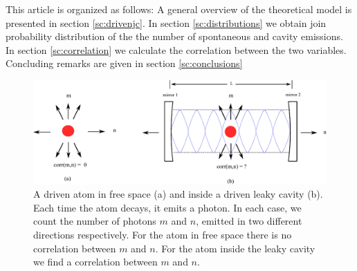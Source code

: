 \documentclass[%
 reprint,
 amsmath,amssymb,
 aps, 
]{revtex4-1}
\begin{document}
This article is organized as follows: A general overview of the
theoretical model is presented in section \ref{sc:drivenjc}. In
section \ref{sc:distributions} we obtain join probability distribution
of the the number of spontaneous and cavity emissions. In section
\ref{sc:correlation} we calculate the correlation between the two
variables. Concluding remarks are given in section
\ref{sc:conclusions}
\begin{center}
\begin{figure}\label{asa}
\begin{center}
\includegraphics[scale = 0.65]{newimagepaper.pdf}
\caption{A driven atom in free space (a) and inside a driven leaky
  cavity (b). Each time the atom decays, it emits a photon. In each
  case, we count the number of photons $m$ and $n$, emitted in two
  different directions respectively. For the atom in free space there
  is no correlation between $m$ and $n$. For the atom inside the leaky
  cavity we find a correlation between $m$ and $n$.}
\end{center}
\end{figure}
\end{center}
\end{document}
